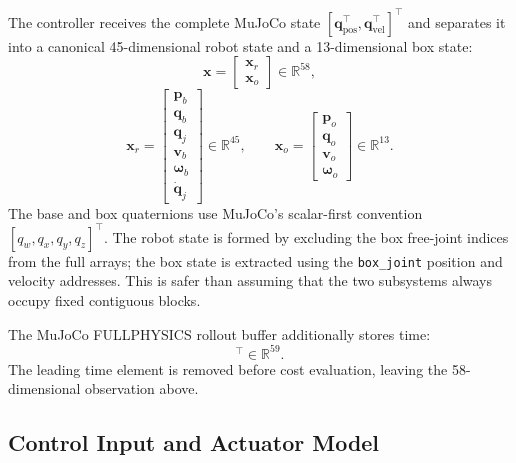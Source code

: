\documentclass[11pt,a4paper]{article}
\newcommand{\R}{\mathbb{R}}
\newcommand{\code}[1]{\texttt{#1}}
\begin{document}
The controller receives the complete MuJoCo state
$[\bm{q}_{\mathrm{pos}}^\top,\bm{q}_{\mathrm{vel}}^\top]^\top$ and separates
it into a canonical 45-dimensional robot state and a 13-dimensional box
state:
\begin{equation}
  \boxed{
  \bm{x}=
  \begin{bmatrix}
    \bm{x}_r\\
    \bm{x}_o
  \end{bmatrix}
  \in\R^{58},}
\end{equation}
\begin{equation}
  \bm{x}_r=
  \begin{bmatrix}
    \bm{p}_b\\
    \bm{q}_b\\
    \bm{q}_j\\
    \bm{v}_b\\
    \bm{\omega}_b\\
    \dot{\bm{q}}_j
  \end{bmatrix}
  \in\R^{45},
  \qquad
  \bm{x}_o=
  \begin{bmatrix}
    \bm{p}_o\\
    \bm{q}_o\\
    \bm{v}_o\\
    \bm{\omega}_o
  \end{bmatrix}
  \in\R^{13}.
\end{equation}
The base and box quaternions use MuJoCo's scalar-first convention
$[q_w,q_x,q_y,q_z]^\top$. The robot state is formed by excluding the box
free-joint indices from the full arrays; the box state is extracted using the
\code{box\_joint} position and velocity addresses. This is safer than assuming
that the two subsystems always occupy fixed contiguous blocks.

The MuJoCo FULLPHYSICS rollout buffer additionally stores time:
\begin{equation}
  [t,\bm{q}_{\mathrm{pos}}^\top,\bm{q}_{\mathrm{vel}}^\top]^\top
  \in\R^{59}.
\end{equation}
The leading time element is removed before cost evaluation, leaving the
58-dimensional observation above.

\subsection{Control Input and Actuator Model}
\end{document}
